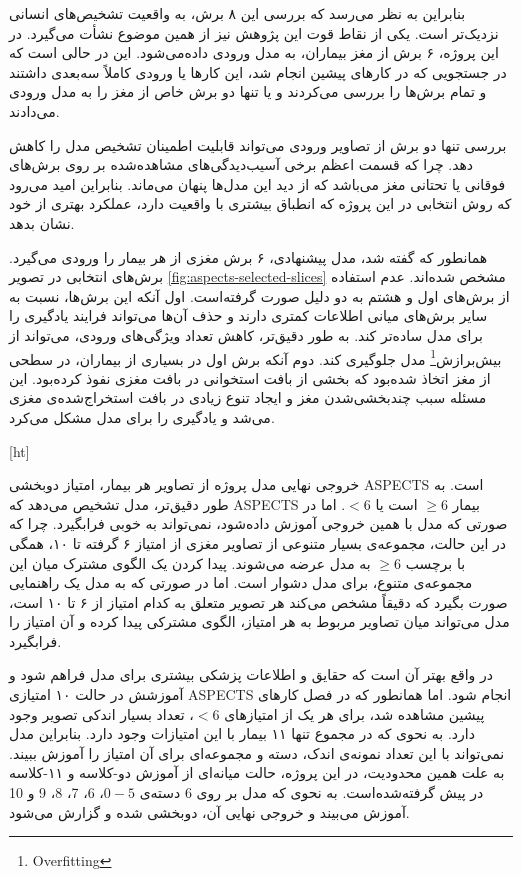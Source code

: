  بنابراین به نظر می‌رسد که بررسی این ۸ برش، به واقعیت تشخیص‌های انسانی نزدیک‌تر است.
 یکی از نقاط قوت این پژوهش نیز از همین موضوع نشأت می‌گیرد.
 در این پروژه، ۶ برش از مغز بیماران، به مدل ورودی داده‌می‌شود.
این در حالی است که در جستجویی که در کارهای پیشین
انجام شد، این کارها یا ورودی کاملاً سه‌بعدی داشتند و تمام برش‌ها را بررسی می‌کردند و یا تنها دو برش خاص از مغز را به مدل ورودی می‌دادند.

بررسی تنها دو برش از تصاویر ورودی می‌تواند قابلیت اطمینان تشخیص مدل را کاهش دهد.
چرا که قسمت اعظم برخی آسیب‌دیدگی‌های مشاهده‌شده
بر روی برش‌های فوقانی یا تحتانی مغز می‌باشد که از دید این مدل‌ها پنهان می‌ماند.
بنابراین امید می‌رود که روش انتخابی در این پروژه که انطباق بیشتری با واقعیت دارد، عملکرد بهتری از خود نشان بدهد.

همانطور که گفته شد، مدل پیشنهادی، ۶ برش مغزی از هر بیمار را ورودی می‌گیرد.
 برش‌های انتخابی در تصویر \ref{fig:aspects-selected-slices} مشخص شده‌اند.
 عدم استفاده از برش‌های اول و هشتم 
به دو دلیل صورت گرفته‌است.
اول آنکه این برش‌ها، نسبت به سایر برش‌های میانی اطلاعات کمتری دارند و حذف آن‌ها می‌تواند فرایند یادگیری را برای مدل ساده‌تر کند.
به طور دقیق‌تر، کاهش تعداد ویژگی‌های ورودی، می‌تواند از 
بیش‌برازش\footnote{Overfitting}
مدل جلوگیری کند.
دوم آنکه برش اول در بسیاری از بیماران، در سطحی از مغز اتخاذ شده‌بود که 
بخشی از بافت استخوانی در بافت مغزی نفوذ کرده‌بود.
این مسئله سبب چند‌بخشی‌شدن مغز و ایجاد تنوع زیادی در بافت استخراج‌شده‌ی مغزی می‌شد و یادگیری را برای مدل مشکل می‌کرد.

[ht]


خروجی نهایی مدل پروژه از تصاویر هر بیمار، امتیاز دوبخشی ASPECTS است.
به طور دقیق‌تر، مدل تشخیص می‌دهد که ASPECTS بیمار $\geq 6$ است یا $<6$.
اما در صورتی که مدل با همین خروجی آموزش داده‌شود،
نمی‌تواند به خوبی فرابگیرد.
چرا که در این حالت،
مجموعه‌ی بسیار متنوعی از تصاویر مغزی از
امتیاز ۶ گرفته تا ۱۰، همگی با برچسب
$\geq6$ به مدل عرضه می‌شوند.
پیدا کردن یک الگوی مشترک میان این مجموعه‌ی متنوع، برای مدل دشوار است.
اما در صورتی که به مدل یک راهنمایی صورت بگیرد که دقیقاً مشخص می‌کند هر تصویر متعلق به کدام امتیاز از ۶ تا ۱۰ است، مدل می‌تواند میان تصاویر مربوط به هر امتیاز، الگوی مشترکی پیدا کرده و آن امتیاز را فرابگیرد.

در واقع بهتر آن است که حقایق و اطلاعات پزشکی بیشتری برای مدل فراهم شود و آموزشش در حالت ۱۰ امتیازی ASPECTS انجام شود.
اما همانطور که در فصل کار‌های پیشین مشاهده شد، برای هر یک از امتیاز‌های $<6$، تعداد بسیار اندکی تصویر وجود دارد.
به نحوی که در مجموع تنها ۱۱ بیمار با این امتیازات وجود دارد.
بنابراین مدل نمی‌تواند با این تعداد نمونه‌ی اندک، دسته و مجموعه‌ای برای آن امتیاز را آموزش ببیند.
به علت همین محدودیت، در این پروژه، حالت میانه‌ای از آموزش دو-کلاسه و ۱۱-کلاسه در پیش گرفته‌شده‌است.
به نحوی که مدل بر روی 6 دسته‌ی $0-5$، 6، 7، 8، 9 و 10 آموزش می‌بیند و خروجی نهایی آن،‌ دوبخشی شده و گزارش می‌شود.

